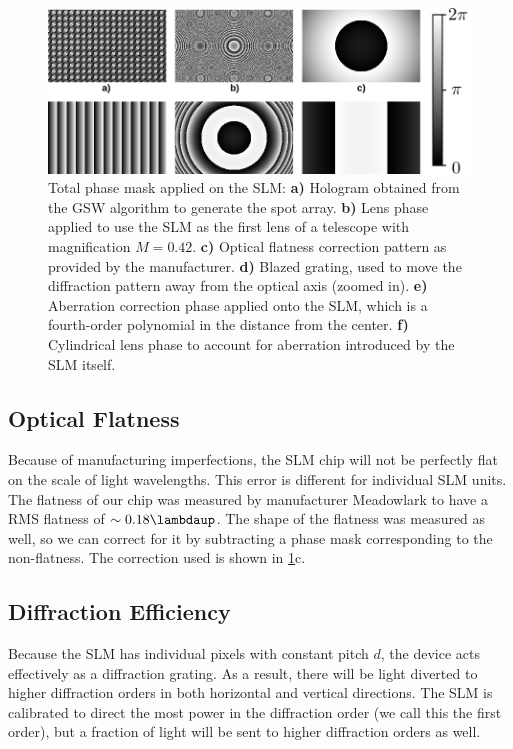 \begin{figure}
	\centering
	\includegraphics[width=\textwidth]{figures/hologram.png}
	\caption{
		Total phase mask applied on the SLM: \textbf{a)} Hologram obtained from the \ac{GSW} algorithm to generate the spot array.
		\textbf{b)} Lens phase applied to use the SLM as the first lens of a telescope with magnification $M=0.42$.
		\textbf{c)} Optical flatness correction pattern as provided by the manufacturer.
		\textbf{d)} Blazed grating, used to move the diffraction pattern away from the optical axis (zoomed in).
		\textbf{e)} Aberration correction phase applied onto the SLM, which is a fourth-order polynomial in the distance from the center.
		\textbf{f)} Cylindrical lens phase to account for aberration introduced by the SLM itself.
	}
	\label{fig:SLMphase}
\end{figure}

\subsection{Optical Flatness}\label{subsec:Flatness}

Because of manufacturing imperfections, the SLM chip will not be perfectly flat on the scale of light wavelengths. 
This error is different for individual SLM units.
The flatness of our chip was measured by manufacturer Meadowlark to have a RMS flatness of $\sim 0.18\lambdaup$.
The shape of the flatness was measured as well, so we can correct for it by subtracting a phase mask corresponding to the non-flatness.
The correction used is shown in \ref{fig:SLMphase}c.

\subsection{Diffraction Efficiency}\label{subsec:Diffraction}

Because the SLM has individual pixels with constant pitch $d$, the device acts effectively as a diffraction grating.
As a result, there will be light diverted to higher diffraction orders in both horizontal and vertical directions.
The SLM is calibrated to direct the most power in the diffraction order (we call this the first order), but a fraction of light will be sent to higher diffraction orders as well.


